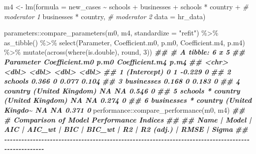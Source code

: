 \documentclass[
]{book}
\newenvironment{Shaded}{\begin{snugshade}}{\end{snugshade}}
\newcommand{\AttributeTok}[1]{\textcolor[rgb]{0.77,0.63,0.00}{#1}}
\newcommand{\CommentTok}[1]{\textcolor[rgb]{0.56,0.35,0.01}{\textit{#1}}}
\newcommand{\DecValTok}[1]{\textcolor[rgb]{0.00,0.00,0.81}{#1}}
\newcommand{\DocumentationTok}[1]{\textcolor[rgb]{0.56,0.35,0.01}{\textbf{\textit{#1}}}}
\newcommand{\FunctionTok}[1]{\textcolor[rgb]{0.00,0.00,0.00}{#1}}
\newcommand{\NormalTok}[1]{#1}
\newcommand{\OtherTok}[1]{\textcolor[rgb]{0.56,0.35,0.01}{#1}}
\newcommand{\SpecialCharTok}[1]{\textcolor[rgb]{0.00,0.00,0.00}{#1}}
\newcommand{\StringTok}[1]{\textcolor[rgb]{0.31,0.60,0.02}{#1}}
\begin{document}
\begin{Shaded}
\begin{Highlighting}[]
\NormalTok{m4 }\OtherTok{\textless{}{-}} \FunctionTok{lm}\NormalTok{(}\AttributeTok{formula =}\NormalTok{ new\_cases }\SpecialCharTok{\textasciitilde{}}
\NormalTok{           schools }\SpecialCharTok{+}
\NormalTok{           businesses }\SpecialCharTok{+}
\NormalTok{           schools }\SpecialCharTok{*}\NormalTok{ country }\SpecialCharTok{+}  \CommentTok{\# moderator 1}
\NormalTok{           businesses }\SpecialCharTok{*}\NormalTok{ country, }\CommentTok{\# moderator 2}
         \AttributeTok{data =}\NormalTok{ hr\_data)}

\NormalTok{parameters}\SpecialCharTok{::}\FunctionTok{compare\_parameters}\NormalTok{(m0, m4, }\AttributeTok{standardize =} \StringTok{"refit"}\NormalTok{) }\SpecialCharTok{\%\textgreater{}\%}
  \FunctionTok{as\_tibble}\NormalTok{() }\SpecialCharTok{\%\textgreater{}\%}
  \FunctionTok{select}\NormalTok{(Parameter, Coefficient.m0, p.m0, Coefficient.m4, p.m4) }\SpecialCharTok{\%\textgreater{}\%}
  \FunctionTok{mutate}\NormalTok{(}\FunctionTok{across}\NormalTok{(}\FunctionTok{where}\NormalTok{(is.double), round, }\DecValTok{3}\NormalTok{))}
\DocumentationTok{\#\# \# A tibble: 6 x 5}
\DocumentationTok{\#\#   Parameter                            Coefficient.m0  p.m0 Coefficient.m4  p.m4}
\DocumentationTok{\#\#   \textless{}chr\textgreater{}                                         \textless{}dbl\textgreater{} \textless{}dbl\textgreater{}          \textless{}dbl\textgreater{} \textless{}dbl\textgreater{}}
\DocumentationTok{\#\# 1 (Intercept)                                   0         1         {-}0.229 0    }
\DocumentationTok{\#\# 2 schools                                       0.366     0          0.077 0.104}
\DocumentationTok{\#\# 3 businesses                                    0.168     0          0.183 0    }
\DocumentationTok{\#\# 4 country (United Kingdom)                     NA        NA          0.546 0    }
\DocumentationTok{\#\# 5 schools * country (United Kingdom)           NA        NA          0.274 0    }
\DocumentationTok{\#\# 6 businesses * country (United Kingdo\textasciitilde{}         NA        NA          0.371 0}
\NormalTok{performance}\SpecialCharTok{::}\FunctionTok{compare\_performance}\NormalTok{(m0, m4)}
\DocumentationTok{\#\# \# Comparison of Model Performance Indices}
\DocumentationTok{\#\# }
\DocumentationTok{\#\# Name | Model |       AIC |  AIC\_wt |       BIC |  BIC\_wt |    R2 | R2 (adj.) |      RMSE |     Sigma}
\DocumentationTok{\#\# {-}{-}{-}{-}{-}{-}{-}{-}{-}{-}{-}{-}{-}{-}{-}{-}{-}{-}{-}{-}{-}{-}{-}{-}{-}{-}{-}{-}{-}{-}{-}{-}{-}{-}{-}{-}{-}{-}{-}{-}{-}{-}{-}{-}{-}{-}{-}{-}{-}{-}{-}{-}{-}{-}{-}{-}{-}{-}{-}{-}{-}{-}{-}{-}{-}{-}{-}{-}{-}{-}{-}{-}{-}{-}{-}{-}{-}{-}{-}{-}{-}{-}{-}{-}{-}{-}{-}{-}{-}{-}{-}{-}{-}{-}{-}{-}{-}{-}{-}{-}}

\end{Highlighting}
\end{Shaded}
\end{document}
